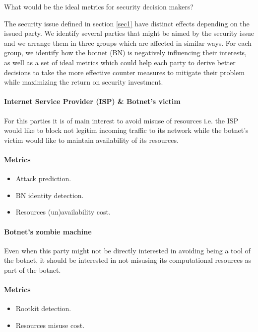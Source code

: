 What would be the ideal metrics for security decision makers?

The security issue defined in section \ref{sec1} have distinct effects depending on the issued party. We identify several parties that might be aimed by the security issue and we arrange them in three groups which are affected in similar ways. For each group, we identify how the botnet (BN) is negatively influencing their interests, as well as a set of ideal metrics which could help each party to derive better decisions to take the more effective counter measures to mitigate their problem while maximizing the return on security investment.

\indent
\paragraph{Internet Service Provider (ISP) \& Botnet's victim}
For this parties it is of main interest to avoid misuse of resources i.e. the ISP would like to block not legitim incoming traffic to its network while the botnet's victim would like to maintain availability of its resources.
\paragraph{Metrics}
\begin{itemize}
    \item Attack prediction.
    \item BN identity detection.
    \item Resources (un)availability cost.
\end{itemize}
\indent
\paragraph{Botnet's zombie machine}
Even when this party might not be directly interested in avoiding being a tool of the botnet, it should be interested in not misusing its computational resources as part of the botnet.
\paragraph{Metrics}
\begin{itemize}
    \item Rootkit detection.
    \item Resources misuse cost.
\end{itemize}
\indent
